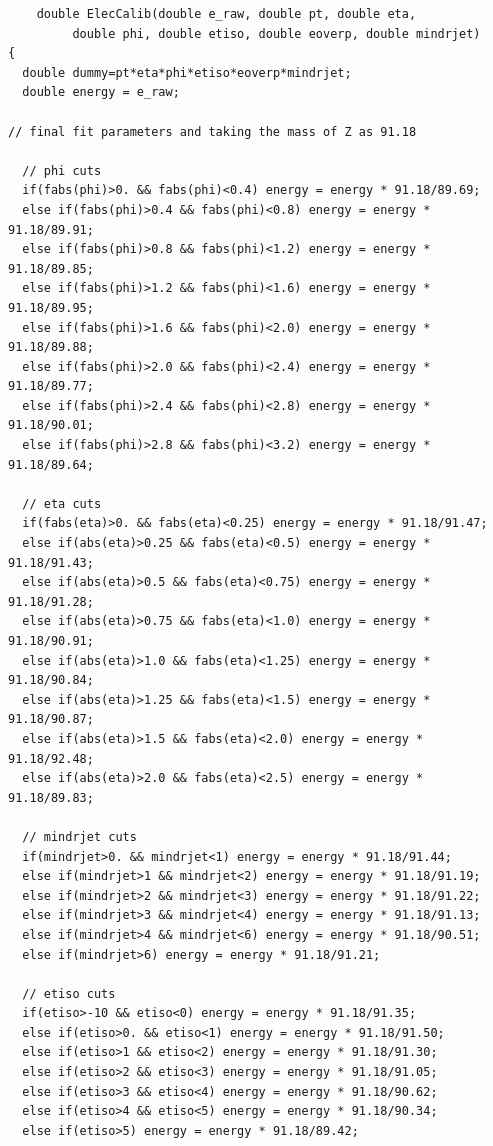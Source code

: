 \documentclass[a4paper]{report}
\numberwithin{equation}{section}
\begin{document}
\begin{tcolorbox}
	\begin{verbatim}
	double ElecCalib(double e_raw, double pt, double eta, 
		 double phi, double etiso, double eoverp, double mindrjet)
{
  double dummy=pt*eta*phi*etiso*eoverp*mindrjet;
  double energy = e_raw;

// final fit parameters and taking the mass of Z as 91.18

  // phi cuts	
  if(fabs(phi)>0. && fabs(phi)<0.4) energy = energy * 91.18/89.69;
  else if(fabs(phi)>0.4 && fabs(phi)<0.8) energy = energy * 91.18/89.91;
  else if(fabs(phi)>0.8 && fabs(phi)<1.2) energy = energy * 91.18/89.85;
  else if(fabs(phi)>1.2 && fabs(phi)<1.6) energy = energy * 91.18/89.95;
  else if(fabs(phi)>1.6 && fabs(phi)<2.0) energy = energy * 91.18/89.88;
  else if(fabs(phi)>2.0 && fabs(phi)<2.4) energy = energy * 91.18/89.77;
  else if(fabs(phi)>2.4 && fabs(phi)<2.8) energy = energy * 91.18/90.01;
  else if(fabs(phi)>2.8 && fabs(phi)<3.2) energy = energy * 91.18/89.64;

  // eta cuts 
  if(fabs(eta)>0. && fabs(eta)<0.25) energy = energy * 91.18/91.47;
  else if(abs(eta)>0.25 && fabs(eta)<0.5) energy = energy * 91.18/91.43;
  else if(abs(eta)>0.5 && fabs(eta)<0.75) energy = energy * 91.18/91.28;
  else if(abs(eta)>0.75 && fabs(eta)<1.0) energy = energy * 91.18/90.91;
  else if(abs(eta)>1.0 && fabs(eta)<1.25) energy = energy * 91.18/90.84;
  else if(abs(eta)>1.25 && fabs(eta)<1.5) energy = energy * 91.18/90.87;
  else if(abs(eta)>1.5 && fabs(eta)<2.0) energy = energy * 91.18/92.48;
  else if(abs(eta)>2.0 && fabs(eta)<2.5) energy = energy * 91.18/89.83;

  // mindrjet cuts 
  if(mindrjet>0. && mindrjet<1) energy = energy * 91.18/91.44;
  else if(mindrjet>1 && mindrjet<2) energy = energy * 91.18/91.19;
  else if(mindrjet>2 && mindrjet<3) energy = energy * 91.18/91.22;
  else if(mindrjet>3 && mindrjet<4) energy = energy * 91.18/91.13;
  else if(mindrjet>4 && mindrjet<6) energy = energy * 91.18/90.51;
  else if(mindrjet>6) energy = energy * 91.18/91.21;

  // etiso cuts 
  if(etiso>-10 && etiso<0) energy = energy * 91.18/91.35;
  else if(etiso>0. && etiso<1) energy = energy * 91.18/91.50;
  else if(etiso>1 && etiso<2) energy = energy * 91.18/91.30;
  else if(etiso>2 && etiso<3) energy = energy * 91.18/91.05;
  else if(etiso>3 && etiso<4) energy = energy * 91.18/90.62;
  else if(etiso>4 && etiso<5) energy = energy * 91.18/90.34;
  else if(etiso>5) energy = energy * 91.18/89.42;


\end{verbatim}
\end{tcolorbox}
\end{document}
